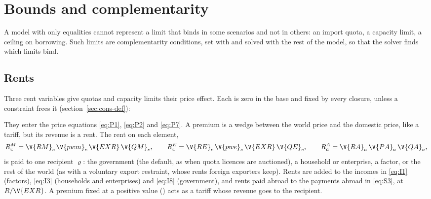 \chapter{Bounds and complementarity}\label{chap:constraints}

A model with only equalities cannot represent a limit that binds in some
scenarios and not in others: an import quota, a capacity limit, a ceiling on
borrowing. Such limits are complementarity conditions, set with
 and solved with the rest of the model, so that the
solver finds which limits bind.

\section{Rents}\label{sec:rents}

Three rent variables give quotas and capacity limits their price effect. Each
is zero in the base and fixed by every closure, unless a constraint frees it
(section~\ref{sec:cons-def}):


They enter the price equations \eqref{eq:P1}, \eqref{eq:P2} and \eqref{eq:P7}.
A premium is a wedge between the world price and the domestic price, like a
tariff, but its revenue is a rent. The rent on each element,
\begin{equation*}
R^M_c = \V{RM}_c\,\V{pwm}_c\,\V{EXR}\,\V{QM}_c, \qquad
R^E_c = \V{RE}_c\,\V{pwe}_c\,\V{EXR}\,\V{QE}_c, \qquad
R^A_a = \V{RA}_a\,\V{PA}_a\,\V{QA}_a,
\end{equation*}
is paid to one recipient $\varrho$: the government (the default, as when quota
licences are auctioned), a household or enterprise, a factor, or the rest of
the world (as with a voluntary export restraint, whose rents foreign exporters
keep). Rents are added to the incomes in \eqref{eq:I1} (factors),
\eqref{eq:I3} (households and enterprises) and \eqref{eq:I8} (government), and
rents paid abroad to the payments abroad in \eqref{eq:S3}, at $R/\V{EXR}$. A
premium fixed at a positive value () acts as a tariff whose
revenue goes to the recipient.

